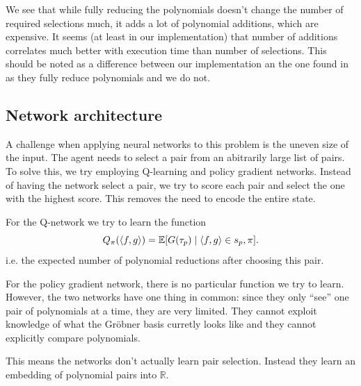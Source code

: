\documentclass{article}
\theoremstyle{changedot}
\theoremstyle{changedotbreak}
\theoremstyle{nonumberplain}
\DeclarePairedDelimiter{\tuple}{\langle}{\rangle}
\newcommand{\m}{\mathbb}
\begin{document}
We see that while fully reducing the polynomials doesn't change the number of required selections much, it adds a lot of polynomial additions, which are expensive. It seems (at least in our implementation) that number of additions correlates much better with execution time than number of selections. This should be noted as a difference between our implementation an the one found in \cite{peifer} as they fully reduce polynomials and we do not.




\subsection{Network architecture}
A challenge when applying neural networks to this problem is the uneven size of the input. The agent needs to select a pair from an abitrarily large list of pairs. To solve this, we try employing Q-learning and policy gradient networks. Instead of having the network select a pair, we try to score each pair and select the one with the highest score. This removes the need to encode the entire state.

For the Q-network we try to learn the function \[Q_{\pi}(\tuple{f, g}) = \m E[G(\tau_{p}) \mid \tuple{f, g} \in s_{p}, \pi].\] i.e. the expected number of polynomial reductions after choosing this pair.

For the policy gradient network, there is no particular function we try to learn. However, the two networks have one thing in common: since they only ``see'' one pair of polynomials at a time, they are very limited. They cannot exploit knowledge of what the Gröbner basis curretly looks like and they cannot explicitly compare polynomials.

This means the networks don't actually learn pair selection. Instead they learn an embedding of polynomial pairs into $\m R$. 
\end{document}
